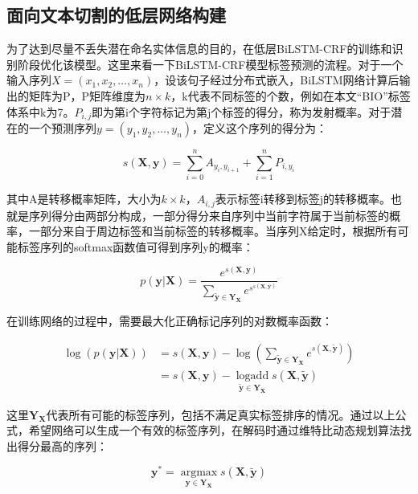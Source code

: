 \documentclass[winfonts,master,oneside,nobackinfo]{njuthesis}
\begin{document}
\subsection{面向文本切割的低层网络构建}

为了达到尽量不丢失潜在命名实体信息的目的，在低层BiLSTM-CRF的训练和识别阶段优化该模型。这里来看一下BiLSTM-CRF模型标签预测的流程。对于一个输入序列$X=\left(x_{1}, x_{2}, \ldots, x_{n}\right)$，设该句子经过分布式嵌入，BiLSTM网络计算后输出的矩阵为P，P矩阵维度为$n \times k$，k代表不同标签的个数，例如在本文“BIO”标签体系中k为7。$P_{i, j}$即为第i个字符标记为第j个标签的得分，称为发射概率。对于潜在的一个预测序列$y=\left(y_{1}, y_{2}, \ldots, y_{n}\right)$，定义这个序列的得分为：

\begin{equation} 
s(\bm{X}, \bm{y})=\sum_{i=0}^{n} A_{y_{i}, y_{i+1}}+\sum_{i=1}^{n} P_{i, y_{i}}
\label{4-1}
\end{equation}

其中A是转移概率矩阵，大小为$k \times k$，$A_{i, j}$表示标签i转移到标签j的转移概率。也就是序列得分由两部分构成，一部分得分来自序列中当前字符属于当前标签的概率，一部分来自于周边标签和当前标签的转移概率。当序列X给定时，根据所有可能标签序列的softmax函数值可得到序列y的概率：

\begin{equation} 
p(\bm{y} | \bm{X})=\frac{e^{s(\bm{X}, \bm{y})}}{\sum_{\tilde{\bm{y}} \in \bm{Y}_{\bm{X}}} e^{s^{s(\bm{X}, \overline{\bm{y}})}}}
\end{equation}

在训练网络的过程中，需要最大化正确标记序列的对数概率函数：

\begin{equation} 
\begin{aligned} \log (p(\bm{y} | \bm{X})) &=s(\bm{X}, \bm{y})-\log \left(\sum_{\tilde{\bm{y}} \in \bm{Y}_{\bm{X}}} e^{s(\bm{X}, \widetilde{\bm{y}})}\right) \\ &=s(\bm{X}, \bm{y})-\operatorname*{logadd}\limits_{\widetilde{\bm{y}} \in \bm{Y}_{\bm{X}}} s(\bm{X}, \widetilde{\bm{y}}) \end{aligned}
\end{equation}

这里$\bm{Y}_{\bm{X}}$代表所有可能的标签序列，包括不满足真实标签排序的情况。通过以上公式，希望网络可以生成一个有效的标签序列，在解码时通过维特比动态规划算法找出得分最高的序列：

\begin{equation} 
\bm{y}^{*}=\underset{\bm{y} \in \bm{Y}_{\bm{X}}}{\operatorname{argmax}} s(\bm{X}, \widetilde{\bm{y}})
\end{equation}
\end{document}
